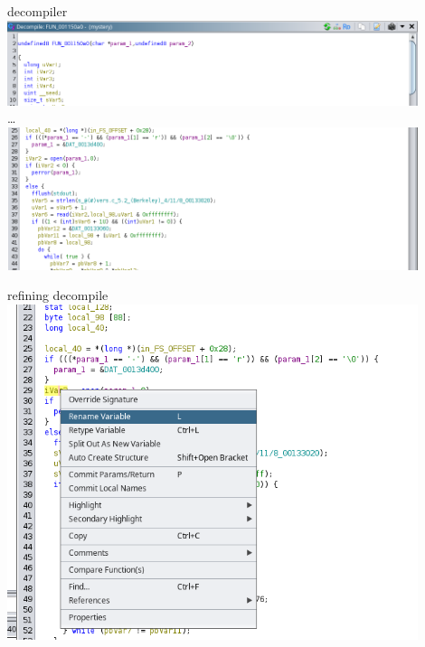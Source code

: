 \begin{frame}{decompiler}
\includegraphics[width=0.9\textwidth]{../re-tools/decomp-top} \\
\ldots  \\
\includegraphics[width=0.9\textwidth]{../re-tools/decomp-rest}
\end{frame}

\begin{frame}{refining decompile}
\includegraphics[width=0.9\textwidth]{../re-tools/ghidra-edit-var-decomp}
\end{frame}
